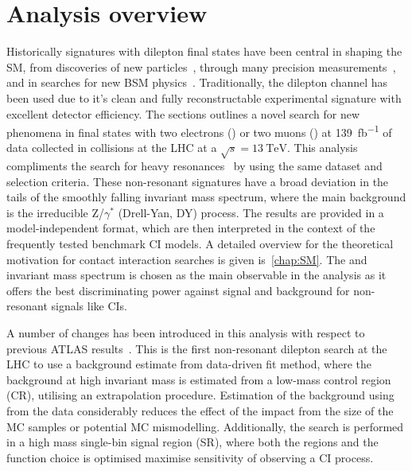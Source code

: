 \chapter{Analysis overview}\label{chap:analyintro}


Historically signatures with dilepton final states have been central in shaping the SM, from discoveries of new particles~\cite{PhysRevLett.33.1404, PhysRevLett.33.1406,1977PhRvL..39..252H,1983398,BAGNAIA1983130}, through many precision measurements~\cite{ALEPH:2005ab,Aad:2016zzw,Aad:2016izn,Sirunyan:2018swq}, and in searches for new BSM physics~\cite{Aad:2019fac,Sirunyan:2018exx,Sirunyan:2018ipj,EXOT-2016-05}. Traditionally, the dilepton channel has been used due to it's clean and fully reconstructable experimental signature with excellent detector efficiency. The sections outlines a novel search for new phenomena in final states with two electrons (\ee) or two muons (\mumu) at \SI{139}{\femto\barn^{-1}} of data collected in \protonproton collisions at the LHC at a $\sqrt{s}=\SI{13}{\tera\electronvolt}$. This analysis compliments the search for heavy resonances~\cite{Aad:2019fac} by using the same dataset and selection criteria. These non-resonant signatures have a broad deviation in the tails of the smoothly falling invariant mass spectrum, where the main background is the irreducible Z/$\gamma^*$ (Drell-Yan, DY) process. The results are provided in a model-independent format, which are then interpreted in the context of the frequently tested benchmark CI models. A detailed overview for the theoretical motivation for contact interaction searches is given is~\cref{chap:SM}. The \ee and \mumu invariant mass spectrum is chosen as the main observable in the analysis as it offers the best discriminating power against signal and background for non-resonant signals like CIs. 

A number of changes has been introduced in this analysis with respect to previous ATLAS results~\cite{EXOT-2016-05}. This is the first non-resonant dilepton search at the LHC to use a background estimate from data-driven fit method, where the background at high invariant mass is estimated from a low-mass control region (CR), utilising an extrapolation procedure. Estimation of the background using from the data considerably reduces the effect of the impact from the size of the MC samples or potential MC mismodelling. Additionally, the search is performed in a high mass single-bin signal region (SR), where both the regions and the function choice is optimised maximise sensitivity of observing a CI process. 

